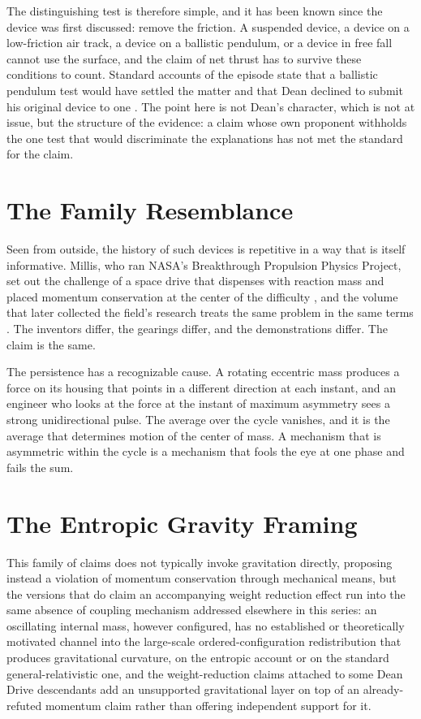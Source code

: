 \documentclass[11pt]{article}
\begin{document}
The distinguishing test is therefore simple, and it has been known since the device was first discussed: remove the friction. A suspended device, a device on a low-friction air track, a device on a ballistic pendulum, or a device in free fall cannot use the surface, and the claim of net thrust has to survive these conditions to count. Standard accounts of the episode state that a ballistic pendulum test would have settled the matter and that Dean declined to submit his original device to one \cite{WD}. The point here is not Dean's character, which is not at issue, but the structure of the evidence: a claim whose own proponent withholds the one test that would discriminate the explanations has not met the standard for the claim.

\section{The Family Resemblance}

Seen from outside, the history of such devices is repetitive in a way that is itself informative. Millis, who ran NASA's Breakthrough Propulsion Physics Project, set out the challenge of a space drive that dispenses with reaction mass and placed momentum conservation at the center of the difficulty \cite{M1997}, and the volume that later collected the field's research treats the same problem in the same terms \cite{MD2009}. The inventors differ, the gearings differ, and the demonstrations differ. The claim is the same.

The persistence has a recognizable cause. A rotating eccentric mass produces a force on its housing that points in a different direction at each instant, and an engineer who looks at the force at the instant of maximum asymmetry sees a strong unidirectional pulse. The average over the cycle vanishes, and it is the average that determines motion of the center of mass. A mechanism that is asymmetric within the cycle is a mechanism that fools the eye at one phase and fails the sum.

\section{The Entropic Gravity Framing}

This family of claims does not typically invoke gravitation directly, proposing instead a violation of momentum conservation through mechanical means, but the versions that do claim an accompanying weight reduction effect run into the same absence of coupling mechanism addressed elsewhere in this series: an oscillating internal mass, however configured, has no established or theoretically motivated channel into the large-scale ordered-configuration redistribution that produces gravitational curvature, on the entropic account or on the standard general-relativistic one, and the weight-reduction claims attached to some Dean Drive descendants add an unsupported gravitational layer on top of an already-refuted momentum claim rather than offering independent support for it.
\end{document}
